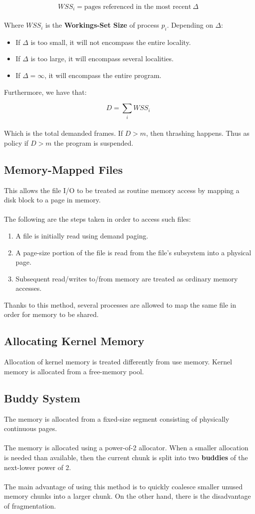 \documentclass{article}
\begin{document}
\[ WSS_i = \text{pages referenced in the most recent}~\Delta \] \\
Where $WSS_i$ is the \textbf{Workings-Set Size} of process $p_i$. Depending on $\Delta$:

\begin{itemize}
	\item If $\Delta$ is too small, it will not encompass the entire locality.
	\item If $\Delta$ is too large, it will encompass several localities.
	\item If $\Delta = \infty$, it will encompass the entire program.
\end{itemize}
Furthermore, we have that:

\[ D = \sum_i WSS_i \] \\
Which is the total demanded frames. If $D > m$, then thrashing happens. Thus as policy if $D > m$ the program is suspended.

\subsection{Memory-Mapped Files}
This allows the file I/O to be treated as routine memory access by mapping a disk block to a page in memory. \\ \\
The following are the steps taken in order to access such files:

\begin{enumerate}
	\item A file is initially read using demand paging.
	\item A page-size portion of the file is read from the file's subsystem into a physical page.
	\item Subsequent read/writes to/from memory are treated as ordinary memory accesses.
\end{enumerate}
Thanks to this method, several processes are allowed to map the same file in order for memory to be shared.

\subsection{Allocating Kernel Memory}
Allocation of kernel memory is treated differently from use memory. Kernel memory is allocated from a free-memory pool.

\subsection{Buddy System}
The memory is allocated from a fixed-size segment consisting of physically continuous pages. \\ \\
The memory is allocated using a power-of-2 allocator. When a smaller allocation is needed than available, then the current chunk is split into two \textbf{buddies} of the next-lower power of 2. \\ \\
The main advantage of using this method is to quickly coalesce smaller unused memory chunks into a larger chunk. On the other hand, there is the disadvantage of fragmentation.
\end{document}
